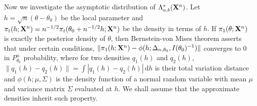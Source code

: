 \documentclass[11pt]{article}
\theoremstyle{plain}
\theoremstyle{definition}
\theoremstyle{remark}
\begin{document}
Now we investigate the asymptotic distribution of $\Lambda_{a,b}^*(\mathbf{X}^n)$.
Let $h=\sqrt{n}(\theta-\theta_0)$ be the local parameter and $\pi_t (h;\mathbf{X}^{n}) = n^{-1/2} \pi_t(\theta_0+n^{-1/2}h;\mathbf{X}^{n})$ be the density in terms of $h$.
If $\pi_1(\theta;\mathbf{X}^{n})$ is exactly the posterior density of $\theta$, then Bernstein-von Mises theorem asserts that under certain conditions,
$
            \|\pi_1(h;\mathbf{X}^{n})-\phi(h;\Delta_{n,\theta_0},I(\theta_0)^{-1})\|
$
converges to $0$ in $P_{\theta_0}^n$ probability,
where for two densities $q_1(h)$ and $q_2(h)$, $\|q_1(h)-q_2(h)\|=\int |q_1(h)-q_2(h)|\, \mathrm d h$ is their total variation distance and $\phi(h; \mu ,\Sigma)$ is the density function of a normal random variable with mean $\mu$ and variance matrix $\Sigma$ evaluated at $h$.
We shall assume that the approximate densities inherit such property.
        
\end{document}
